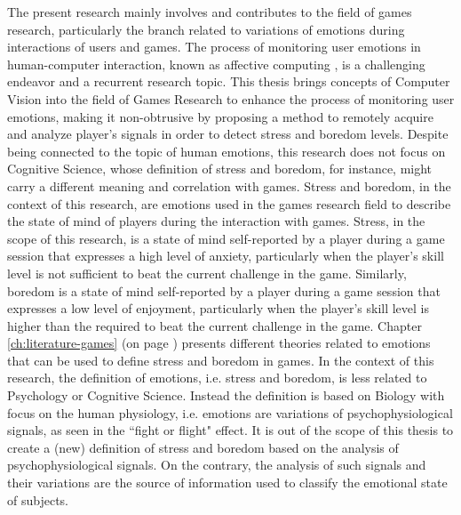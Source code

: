 The present research mainly involves and contributes to the field of games research, particularly the branch related to variations of emotions during interactions of users and games. The process of monitoring user emotions in human-computer interaction, known as affective computing \parencite{picard2000affective}, is a challenging endeavor and a recurrent research topic. This thesis brings concepts of Computer Vision into the field of Games Research to enhance the process of monitoring user emotions, making it non-obtrusive by proposing a method to remotely acquire and analyze player's signals in order to detect stress and boredom levels. Despite being connected to the topic of human emotions, this research does not focus on Cognitive Science, whose definition of stress and boredom, for instance, might carry a different meaning and correlation with games. Stress and boredom, in the context of this research, are emotions used in the games research field to describe the state of mind of players during the interaction with games. Stress, in the scope of this research, is a state of mind self-reported by a player during a game session that expresses a high level of anxiety, particularly when the player's skill level is not sufficient to beat the current challenge in the game. Similarly, boredom is a state of mind self-reported by a player during a game session that expresses a low level of enjoyment, particularly when the player's skill level is higher than the required to beat the current challenge in the game. Chapter \ref{ch:literature-games} (on page \pageref{ch:literature-games}) presents different theories related to emotions that can be used to define stress and boredom in games. In the context of this research, the definition of emotions, i.e. stress and boredom, is less related to Psychology or Cognitive Science. Instead the definition is based on Biology with focus on the human physiology, i.e. emotions are variations of psychophysiological signals, as seen in the ``fight or flight" effect. It is out of the scope of this thesis to create a (new) definition of stress and boredom based on the analysis of psychophysiological signals. On the contrary, the analysis of such signals and their variations are the source of information used to classify the emotional state of subjects.
